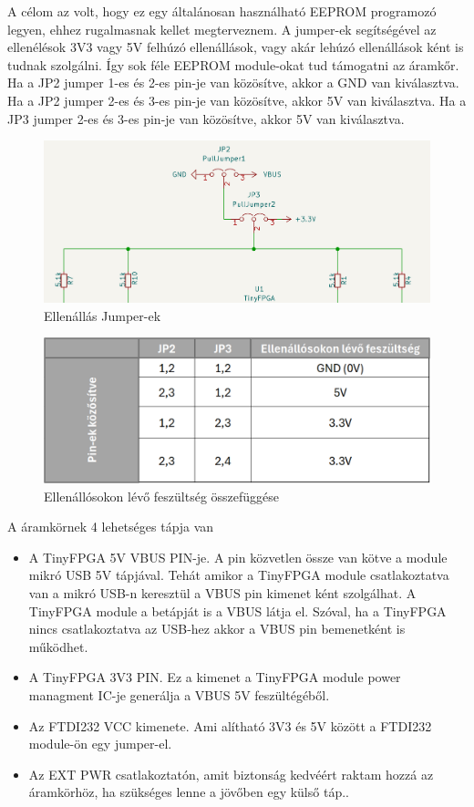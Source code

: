 \documentclass[a4paper,12pt,oneside]{book}
\begin{document}
A célom az volt, hogy ez egy általánosan használható EEPROM programozó legyen, ehhez rugalmasnak kellet megterveznem.  A jumper-ek segítségével az ellenélésok 3V3 vagy 5V felhúzó ellenállások, vagy akár lehúzó ellenállások ként is tudnak szolgálni. Így sok féle EEPROM module-okat tud támogatni az áramkőr. Ha a JP2 jumper 1-es és 2-es pin-je van közösítve, akkor a GND van kiválasztva. Ha a JP2 jumper 2-es és 3-es pin-je van közösítve, akkor 5V van kiválasztva. Ha a JP3 jumper 2-es és 3-es pin-je van közösítve, akkor 5V van kiválasztva.
\begin{figure}[H]
	\centering
	\includegraphics[trim=1mm 1mm 1mm 1mm,scale=0.29]{jumperek.PNG}
	\caption{Ellenállás Jumper-ek}
	\label{Ellenállás Jumper-ek}
\end{figure}
\begin{figure}[H]
	\centering
	\includegraphics[trim=1mm 1mm 1mm 1mm,scale=0.45]{jumpertable.PNG}
	\caption{Ellenállósokon lévő feszültség összefüggése}
	\label{Ellenállósokon lévő feszültség összefüggése}
\end{figure}
A áramkörnek 4 lehetséges tápja van
\begin{itemize}
	\item A TinyFPGA 5V VBUS PIN-je. A pin közvetlen össze van kötve a module mikró USB 5V tápjával. Tehát amikor a TinyFPGA module csatlakoztatva van a mikró USB-n keresztül a VBUS pin kimenet ként szolgálhat. A TinyFPGA module a betápját is a VBUS látja el. Szóval, ha a TinyFPGA nincs csatlakoztatva az USB-hez akkor a VBUS pin bemenetként is működhet.
	\item A TinyFPGA 3V3 PIN. Ez a kimenet a TinyFPGA module power managment IC-je generálja a VBUS 5V feszültégéből.
	\item Az FTDI232 VCC kimenete. Ami alítható 3V3 és 5V között a FTDI232 module-ön egy jumper-el.
	\item Az EXT PWR csatlakoztatón, amit biztonság kedvéért raktam hozzá az áramkörhöz, ha szükséges lenne a jövőben egy külső táp..
\end{itemize}
\end{document}
